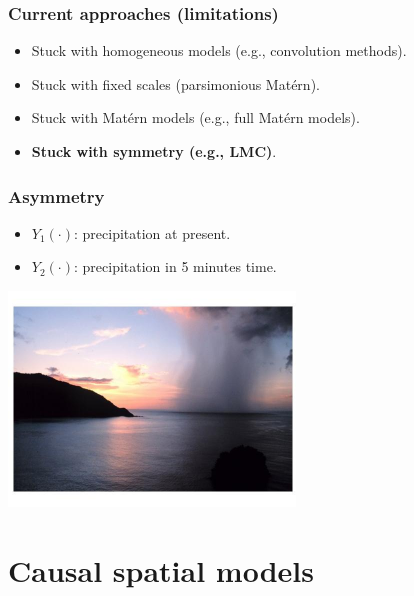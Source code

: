 \documentclass{beamer}
\begin{document}

\begin{frame}
\frametitle{Current approaches (limitations)}

\begin{itemize}
\item Stuck with homogeneous models (e.g., convolution methods). \vfill
\item Stuck with fixed scales (parsimonious Matérn). \vfill
\item Stuck with Matérn models (e.g., full Matérn models). \vfill
\item {\bf Stuck with symmetry (e.g., LMC)}. \vfill
\end{itemize}

\end{frame}


\begin{frame}
\frametitle{Asymmetry}

\begin{itemize}
\item $Y_1(\cdot)$: precipitation at present.        
\item $Y_2(\cdot)$: precipitation in 5 minutes time.
\end{itemize}

\begin{center}
\includegraphics[width=3in]{rain.png}
\end{center}
\end{frame}


\section{Causal spatial models}

\begin{frame}
\sectionpage
\end{frame}
\end{document}
